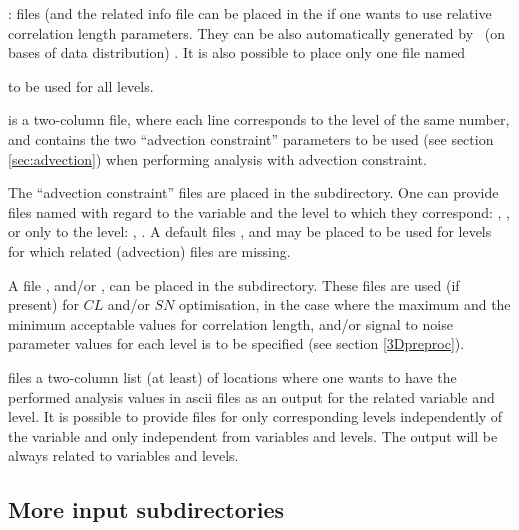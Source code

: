 \underline{}: files (and the related info file  can be placed in the \linebreak {} if one wants to use relative correlation length parameters. They can be also automatically generated by \diva\ (on bases of data distribution) . It is also possible to place only one file named { to be used for all levels.

\underline{} is a two-column file, where each line corresponds to the level of the same number, and contains the two ``advection constraint'' parameters to be used (see section \ref{sec:advection}) when performing analysis with advection constraint.

The ``advection constraint'' files are placed in the  subdirectory. One can provide files named with regard to the variable and the level to which they correspond: , , or only to the level: , . A default files ,  and  may be placed to be used for levels for which related (advection) files are missing.

A file \underline{}, and/or \underline{}, can be placed in the  subdirectory. These files are used (if present) for $CL$ and/or $SN$ optimisation, in the case where the maximum and the minimum acceptable values for correlation length, and/or signal to noise parameter values for each level is to be specified (see section \ref{3Dpreproc}).


\underline{} files a two-column list (at least) of locations where one wants to have the performed analysis values in ascii files as an output for the related variable and level. It is possible to provide files  for only corresponding levels independently of the variable and only  independent from variables and levels. The output will be always related to variables and levels.



\subsection{More  input subdirectories}


\subsubsection{}

}
